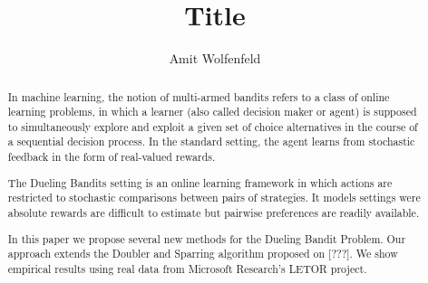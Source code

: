 \documentclass{llncs}
\author{Amit Wolfenfeld\inst{1}}
\institute{Technion}
\title{Title}
\begin{document}
\maketitle

\begin{abstract}
In machine learning, the notion of multi-armed bandits refers
to a class of online learning problems, in which a learner (also called decision maker or agent)  is supposed to simultaneously explore and exploit a given set of choice alternatives in the course of a sequential decision process. 
In the standard setting, the agent learns from stochastic feedback in the form of real-valued rewards.

The Dueling Bandits setting is an online learning framework in which actions are restricted to stochastic comparisons between pairs of strategies.
It models settings were absolute rewards are difficult to estimate but pairwise preferences are readily available. 

In this paper we propose several new methods for the Dueling Bandit Problem. Our approach extends the Doubler and Sparring algorithm proposed on [???]. We show empirical results using real data from Microsoft Research's LETOR project.
\end{abstract}
\end{document}
